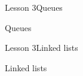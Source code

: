 \documentclass[aspectratio=1610]{beamer}
\begin{document}
\begin{frame}{Lesson 3}{Queues}
\begin{center}
\Huge Queues
\end{center}
\end{frame}



\begin{frame}{Lesson 3}{Linked lists}
\begin{center}
\Huge Linked lists
\end{center}
\end{frame}
\end{document}
